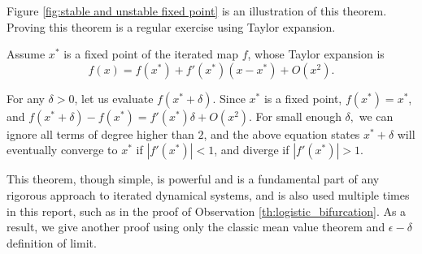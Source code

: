 Figure \ref{fig:stable and unstable fixed point} is an illustration of this theorem.
Proving this theorem is a regular exercise using Taylor expansion. 

Assume $x^*$ is a fixed point of the iterated map $f$, whose Taylor expansion is
$$f(x) = f(x^*) + f'(x^*) (x - x^*) + O(x^2).$$

For any $\delta>0$, let us evaluate $f(x^* + \delta)$.
Since $x^*$ is a fixed point,
 $f(x^*) = x^*$, and
 $f(x^* + \delta) - f(x^*) = f'(x^*) \delta + O(x^2)$. 
For small enough $\delta,$ we can ignore all terms of degree higher than $2$, and the above equation states $x^*+ \delta$ will eventually converge to $x^*$ if $|f'(x^*)| < 1$, and diverge if $|f'(x^*)| > 1$.

This theorem, though simple, is powerful and is a fundamental part of any rigorous approach to iterated dynamical systems, and is also used multiple times in this report, such as in the proof of Observation \ref{th:logistic_bifurcation}. 
As a result, we give another proof using only the classic mean value theorem and $\epsilon-\delta$ definition of limit.

